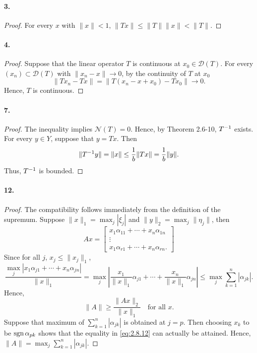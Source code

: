   \paragraph{3.}
  \begin{proof}
    For every $x$ with $\|x\|<1$, $\|Tx\|\le \|T\|\|x\|<\|T\|$.
  \end{proof}

  \paragraph{4.}
  \begin{proof}
    Suppose that the linear operator $T$ is continuous at $x_0\in
    \mathscr{D}(T)$. For every $(x_n)\subset\mathscr{D}(T)$ with $\|x_n-x\|\to
    0$, by the continuity of $T$ at $x_0$
    \[
      \|Tx_n-Tx\|=\|T(x_n-x+x_0)-Tx_0\| \to 0.
    \]
    Hence, $T$ is continuous.
  \end{proof}

  \paragraph{7.}
  \begin{proof}
    The inequality implies $\mathscr{N}(T)=0$. Hence, by Theorem 2.6-10, $T^{-1}$
    exists. For every $y\in Y$, suppose that $y=Tx$. Then
    \[
      \|T^{-1} y\| = \|x\| \le \frac{1}{b}\|Tx\| = \frac{1}{b}\|y\|.
    \]
    Thus, $T^{-1}$ is bounded.
  \end{proof}

  \paragraph{12.}
  \begin{proof}
    The compatibility follows immediately from the definition of the supremum.
    Suppose $\|x\|_1=\max_j|\xi_j|$ and $\|y\|_2=\max_j\|\eta_j\|$, then
    \[
      Ax = 
      \begin{bmatrix}
        x_1\alpha_{11} + \cdots + x_n\alpha_{1n} \\
        \vdots \\
        x_1\alpha_{r1} + \cdots + x_n\alpha_{rn}.
      \end{bmatrix}
    \]
    Since for all $j$, $x_j\le \|x_j\|_1$,
    \[
      \frac{\max_j|x_1\alpha_{j1}+\cdots+x_n\alpha_{jn}|}{\|x\|_1}
      =\max_j\left|\frac{x_1}{\|x\|_1}\alpha_{j1}+\cdots
      +\frac{x_n}{\|x\|_1}\alpha_{jn}\right|
      \le \max_{j}\sum_{k=1}^n|\alpha_{jk}|.
    \]
    Hence, 
    \begin{equation}
      \label{eq:2.8.12}
      \|A\|\ge \frac{\|Ax\|_2}{\|x\|_1} \quad\text{for all $x$}.
    \end{equation}
    Suppose that maximum of $\sum_{k=1}^n|\alpha_{jk}|$ is obtained at $j=p$.
    Then choosing $x_k$ to be $\operatorname{sgn} \alpha_{pk}$ shows that the equality in 
    \eqref{eq:2.8.12} can actually be attained. Hence, $\|A\|=\max_{j}
    \sum_{k=1}^n|\alpha_{jk}|$.
  \end{proof}
